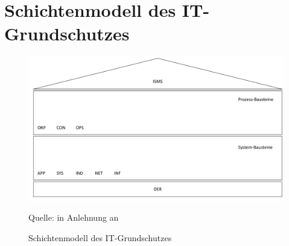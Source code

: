 \section{Schichtenmodell des IT-Grundschutzes}
\begin{figure}[H]
	\centering
	\includegraphics[scale=0.45]{img/bsiSchichtenmodell.pdf}
	\caption{Schichtenmodell des IT-Grundschutzes}
	{\footnotesize Quelle: in Anlehnung an \cite[][S.\,9]{bundesamt_fur_sicherheit_in_der_informationstechnik_bsi_it-grundschutz-kompendium_2020}}
	\label{abb:BSISchichtenmodell}
\end{figure}

